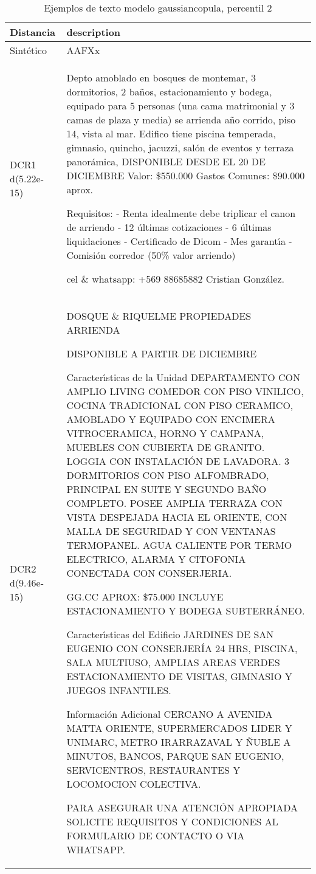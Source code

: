\begin{table}[H]
\centering
\fontsize{10}{14}\selectfont
\caption{Ejemplos de texto modelo gaussiancopula, percentil 2}
\label{table-example-economicos-b-3-gaussiancopula-2p-text}
\begin{tabular}{|l|m{35em}|}
\hline
\rowcolor[gray]{0.8}
Distancia & description \\
\hline Sintético & AAFXx \\
\hline DCR1 d(5.22e-15) & Depto amoblado en bosques de montemar, 3 dormitorios, 2 ba\~nos, estacionamiento y bodega, equipado para 5 personas (una cama matrimonial y 3 camas de plaza y media) se arrienda a\~no corrido, piso 14, vista al mar.
Edifico tiene piscina temperada, gimnasio, quincho, jacuzzi, sal\'on de eventos y terraza panor\'amica, 
DISPONIBLE DESDE EL 20 DE DICIEMBRE
Valor: \$550.000
Gastos Comunes: \$90.000 aprox.

Requisitos:
- Renta idealmente debe triplicar el canon de arriendo 
- 12 \'ultimas cotizaciones
- 6 \'ultimas liquidaciones
- Certificado de Dicom
- Mes garant{\'\i}a
- Comisi\'on corredor (50\% valor arriendo)

cel \& whatsapp: +569 88685882
Cristian Gonz\'alez.
 \\
\hline DCR2 d(9.46e-15) & DOSQUE \& RIQUELME PROPIEDADES ARRIENDA

DISPONIBLE A PARTIR DE DICIEMBRE

Caracter{\'\i}sticas de la Unidad
DEPARTAMENTO CON AMPLIO LIVING COMEDOR CON PISO VINILICO, COCINA TRADICIONAL CON PISO CERAMICO, AMOBLADO Y EQUIPADO CON ENCIMERA VITROCERAMICA, HORNO Y CAMPANA, MUEBLES CON CUBIERTA DE GRANITO. LOGGIA CON INSTALACI\'ON DE LAVADORA. 3 DORMITORIOS CON PISO ALFOMBRADO, PRINCIPAL EN SUITE Y SEGUNDO BA\~NO COMPLETO. POSEE AMPLIA TERRAZA CON VISTA DESPEJADA HACIA EL ORIENTE, CON MALLA DE SEGURIDAD Y CON VENTANAS TERMOPANEL. AGUA CALIENTE POR TERMO ELECTRICO, ALARMA Y CITOFONIA CONECTADA CON CONSERJERIA.

GG.CC APROX: \$75.000
INCLUYE ESTACIONAMIENTO Y BODEGA SUBTERR\'ANEO.

Caracter{\'\i}sticas del Edificio
JARDINES DE SAN EUGENIO CON CONSERJER\'IA 24 HRS, PISCINA, SALA MULTIUSO, AMPLIAS AREAS VERDES ESTACIONAMIENTO DE VISITAS, GIMNASIO Y JUEGOS INFANTILES.

Informaci\'on Adicional
CERCANO A AVENIDA MATTA ORIENTE, SUPERMERCADOS LIDER Y UNIMARC, METRO IRARRAZAVAL Y \~NUBLE A MINUTOS, BANCOS, PARQUE SAN EUGENIO, SERVICENTROS, RESTAURANTES Y LOCOMOCION COLECTIVA.

PARA ASEGURAR UNA ATENCI\'ON APROPIADA SOLICITE REQUISITOS Y CONDICIONES AL FORMULARIO DE CONTACTO O VIA WHATSAPP.  
 \\
\hline
\end{tabular}
\end{table}
